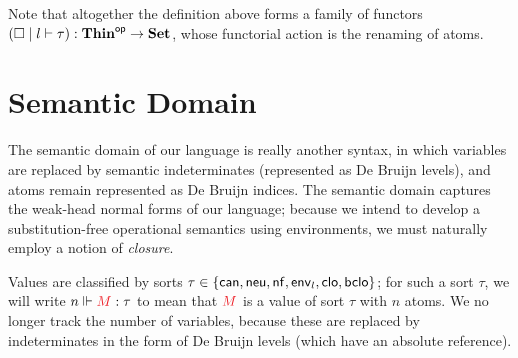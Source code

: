 \documentclass{article}
\DeclarePairedDelimiter\Parens{\lparen}{\rparen}
\DeclarePairedDelimiter\Angles{\langle}{\rangle}
\DeclarePairedDelimiter\Squares{[}{]}
\DeclarePairedDelimiter\Braces{\lbrace}{\rbrace}
\newcommand\FmtKwd[1]{\mathsf{#1}}
\newcommand\FmtThin[1]{{\color{ProcessBlue}#1}}
\newcommand\THIN{\mathbf{Thin}}
\newcommand\OpCat[1]{{#1}^{\mathsf{op}}}
\newcommand\SET{\mathbf{Set}}
\newcommand\Tm[3]{{#1}\mid{#2}\vdash{#3}}
\newcommand\FmtTm[1]{{\color{Violet}#1}}
\newcommand\FmtVal[1]{{\color{Red}{#1}}}
\begin{document}
Note that altogether the definition above forms a family of functors
$\Parens*{\Tm{\square}{l}{\tau}}:\OpCat{\THIN}\to\SET$, whose
functorial action is the renaming of atoms.

\section{Semantic Domain}

The semantic domain of our language is really another syntax, in which
variables are replaced by semantic indeterminates (represented as De
Bruijn levels), and atoms remain represented as De Bruijn indices. The
semantic domain captures the weak-head normal forms of our language;
because we intend to develop a substitution-free operational semantics
using environments, we must naturally employ a notion of
\emph{closure}.

\newcommand\SortCan{\FmtKwd{can}}
\newcommand\SortNeu{\FmtKwd{neu}}
\newcommand\SortNf{\FmtKwd{nf}}
\newcommand\SortClo{\FmtKwd{clo}}
\newcommand\SortBClo{\FmtKwd{bclo}}
\newcommand\SortEnv[1]{\FmtKwd{env}_{#1}}
\newcommand\IsVal[3]{{#1}\Vdash\FmtVal{#2}:{#3}}
\newcommand\Val[2]{{#1}\Vdash{#2}}

\newcommand\Clo[4]{
  \Squares*{
    \FmtThin{#1}%
    \mathbin{\color{gray}*}%
    \Angles*{
      \FmtTm{#4}
      \mathbin{\color{gray}\triangleleft}%
      \FmtThin{#2}
      \mathbin{\color{gray}*}%
      \FmtVal{#3}
    }
  }
}

\newcommand\BClo[4]{
  \Squares*{
    \FmtThin{#1}%
    \mathbin{\color{gray}*}%
    \Angles*{
      \FmtTm{#4}
      \mathbin{\color{gray}\triangleleft^+}%
      \FmtThin{#2}
      \mathbin{\color{gray}*}%
      \FmtVal{#3}
    }
  }
}


Values are classified by sorts
$\tau\in\Braces*{\SortCan,\SortNeu,\SortNf,\SortEnv{l},\SortClo,\SortBClo}$; for
such a sort $\tau$, we will write $\IsVal{n}{M}{\tau}$ to mean that
$\FmtVal{M}$ is a value of sort $\tau$ with $n$ atoms. We no longer
track the number of variables, because these are replaced by
indeterminates in the form of De Bruijn levels (which have an absolute
reference).
\end{document}
